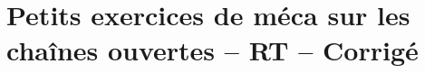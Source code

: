 \documentclass[10pt,fleqn]{article}
\newcommand{\repRel}{../..}
\newcommand{\repStyle}{\repRel/Style}
\newcommand{\td}{fichier_td}
\newcommand{\repExos}{\repRel/ExercicesCompetences}
\newcommand{\repExo}{dossier}
\begin{document}
\section*{Petits exercices de méca sur les chaînes ouvertes -- RT -- Corrigé} 

\begin{multicols}{2} 
\renewcommand{\repExo}{\repExos/B2_ProposerModele/B2_12_ModeliserSchemasCinematiques/05_RT}
\renewcommand{\td}{05_RT}
\graphicspath{{\repStyle/png/}{\repExo/images/}}


\renewcommand{\repExo}{\repExos/B2_ProposerModele/B2_13_ModeliserCinematique/05_RT}
\renewcommand{\td}{05_RT}
\graphicspath{{\repStyle/png/}{\repExo/images/}}


\renewcommand{\repExo}{\repExos/B2_ProposerModele/B2_13_ModeliserCinematique/05_RT_02}
\renewcommand{\td}{05_RT_02}
\graphicspath{{\repStyle/png/}{\repExo/images/}}


\renewcommand{\repExo}{\repExos/C1_ProposerDemarche/C1_05_ProposerDemarcheActionMecaLoiMvt_PFS/05_RT}
\renewcommand{\td}{05_RT}
\graphicspath{{\repStyle/png/}{\repExo/images/}}


\renewcommand{\repExo}{\repExos/C2_MettreEnOeuvreDemarche/C2_07_PFS/05_RT}
\renewcommand{\td}{05_RT}
\graphicspath{{\repStyle/png/}{\repExo/images/}}


\end{multicols}
\end{document}

